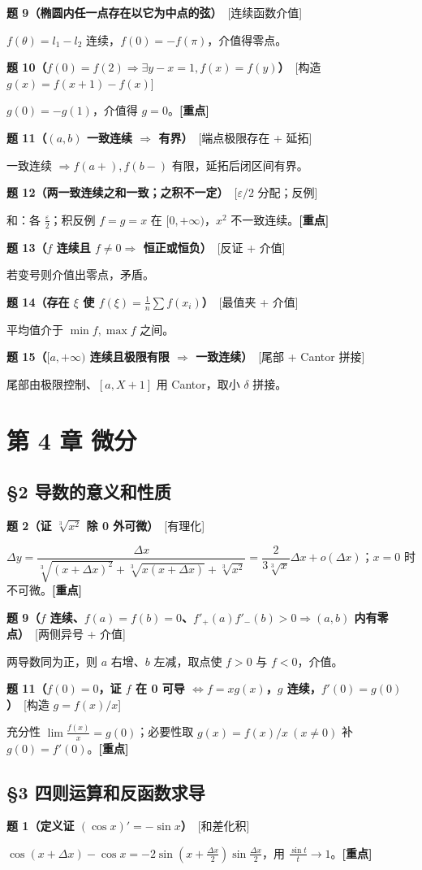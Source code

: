 \documentclass[11pt,a4paper,UTF8]{ctexart}
\newcommand{\eps}{\varepsilon}
\newcommand{\p}[2]{\par\smallskip\noindent\textbf{#1}\ \textcolor{blue!55!black}{[#2]}\par\nopagebreak}
\begin{document}
\p{题 9（椭圆内任一点存在以它为中点的弦）}{连续函数介值}
$f(\theta)=l_1-l_2$ 连续，$f(0)=-f(\pi)$，介值得零点。

\p{题 10（$f(0)=f(2)\Rightarrow\exists y-x=1,f(x)=f(y)$）}{构造 $g(x)=f(x+1)-f(x)$}
$g(0)=-g(1)$，介值得 $g=0$。\textbf{[重点]}

\p{题 11（$(a,b)$ 一致连续 $\Rightarrow$ 有界）}{端点极限存在 + 延拓}
一致连续 $\Rightarrow f(a+),f(b-)$ 有限，延拓后闭区间有界。

\p{题 12（两一致连续之和一致；之积不一定）}{$\eps/2$ 分配；反例}
和：各 $\frac\eps2$；积反例 $f=g=x$ 在 $[0,+\infty)$，$x^2$ 不一致连续。\textbf{[重点]}

\p{题 13（$f$ 连续且 $f\ne0\Rightarrow$ 恒正或恒负）}{反证 + 介值}
若变号则介值出零点，矛盾。

\p{题 14（存在 $\xi$ 使 $f(\xi)=\frac1n\sum f(x_i)$）}{最值夹 + 介值}
平均值介于 $\min f,\max f$ 之间。

\p{题 15（$[a,+\infty)$ 连续且极限有限 $\Rightarrow$ 一致连续）}{尾部 + Cantor 拼接}
尾部由极限控制、$[a,X+1]$ 用 Cantor，取小 $\delta$ 拼接。

\section{第 4 章 微分}

\subsection*{§2 导数的意义和性质}
\p{题 2（证 $\sqrt[3]{x^2}$ 除 0 外可微）}{有理化}
$\Delta y=\dfrac{\Delta x}{\sqrt[3]{(x+\Delta x)^2}+\sqrt[3]{x(x+\Delta x)}+\sqrt[3]{x^2}}=\dfrac{2}{3\sqrt[3]x}\Delta x+o(\Delta x)$；$x=0$ 时不可微。\textbf{[重点]}

\p{题 9（$f$ 连续、$f(a)=f(b)=0$、$f'_+(a)f'_-(b)>0\Rightarrow(a,b)$ 内有零点）}{两侧异号 + 介值}
两导数同为正，则 $a$ 右增、$b$ 左减，取点使 $f>0$ 与 $f<0$，介值。

\p{题 11（$f(0)=0$，证 $f$ 在 0 可导 $\iff f=xg(x)$，$g$ 连续，$f'(0)=g(0)$）}{构造 $g=f(x)/x$}
充分性 $\lim\frac{f(x)}x=g(0)$；必要性取 $g(x)=f(x)/x\ (x\ne0)$ 补 $g(0)=f'(0)$。\textbf{[重点]}

\subsection*{§3 四则运算和反函数求导}
\p{题 1（定义证 $(\cos x)'=-\sin x$）}{和差化积}
$\cos(x+\Delta x)-\cos x=-2\sin(x+\frac{\Delta x}2)\sin\frac{\Delta x}2$，用 $\frac{\sin t}{t}\to1$。\textbf{[重点]}
\end{document}
